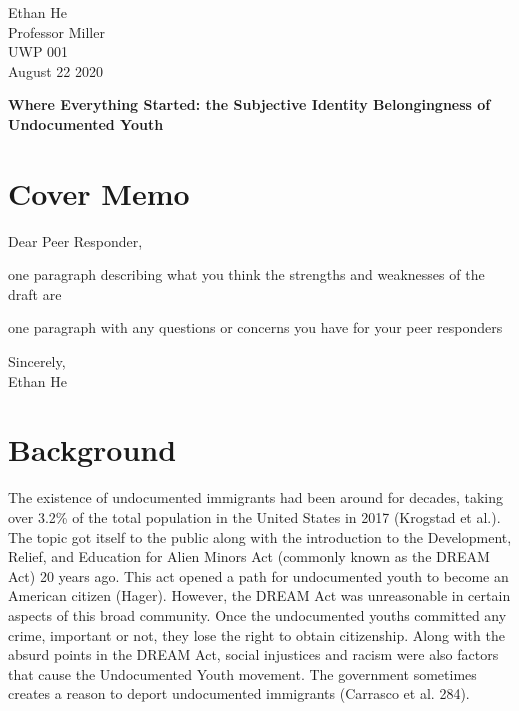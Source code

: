 \documentclass[12pt]{article}
\begin{document}
\begin{flushleft}

Ethan He \\
Professor Miller \\
UWP 001 \\
August 22 2020 \\

\begin{center}
    \textbf{Where Everything Started: the Subjective Identity Belongingness of Undocumented Youth}
\end{center}

\setlength{\parindent}{0.5in}

\section*{Cover Memo}

\noindent
Dear Peer Responder,

one paragraph describing what you think the strengths and weaknesses of the draft are

one paragraph with any questions or concerns you have for your peer responders

\noindent
Sincerely, \\
\noindent
Ethan He

\section{Background}

The existence of undocumented immigrants had been around for decades, taking over 3.2\% of the total population in the United States in 2017 (Krogstad et al.). 
The topic got itself to the public along with the introduction to the Development, Relief, and Education for Alien Minors Act (commonly known as the DREAM Act) 20 years ago. This act opened a path for undocumented youth to become an American citizen (Hager). 
However, the DREAM Act was unreasonable in certain aspects of this broad community. 
Once the undocumented youths committed any crime, important or not, they lose the right to obtain citizenship. 
Along with the absurd points in the DREAM Act, social injustices and racism were also factors that cause the Undocumented Youth movement. The government sometimes creates a reason to deport undocumented immigrants (Carrasco et al. 284). 



\end{flushleft}
\end{document}
